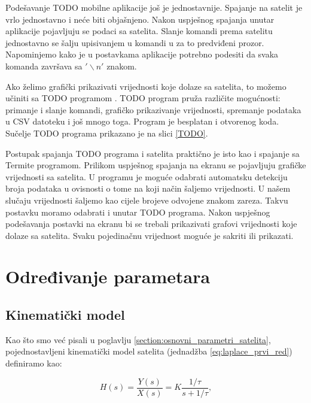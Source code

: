 \documentclass[times, utf8, diplomski, numeric]{templates/template}
\begin{document}
{{        Podešavanje TODO mobilne aplikacije još je jednostavnije. Spajanje na satelit je vrlo jednostavno i neće biti objašnjeno. Nakon uspješnog spajanja unutar aplikacije pojavljuju se podaci sa satelita. Slanje komandi prema satelitu jednostavno se šalju upisivanjem u komandi u za to predviđeni prozor. Napominjemo kako je u postavkama aplikacije potrebno podesiti da svaka komanda završava sa $'\backslash n'$ znakom. 

        
        Ako želimo grafički prikazivati vrijednosti koje dolaze sa satelita, to možemo učiniti sa TODO programom \cite{}. TODO program pruža različite mogućnosti: primanje i slanje komandi, grafičko prikazivanje vrijednosti, spremanje podataka u CSV datoteku i još mnogo toga. Program je besplatan i otvorenog koda. Sučelje TODO programa prikazano je na slici \ref{TODO}.


        Postupak spajanja TODO programa i satelita praktično je isto kao i spajanje sa Termite programom. Prilikom uspješnog spajanja na ekranu se pojavljuju grafičke vrijednosti sa satelita. U programu je moguće odabrati automatsku detekciju broja podataka u ovisnosti o tome na koji način šaljemo vrijednosti. U našem slučaju vrijednosti šaljemo kao cijele brojeve odvojene znakom zareza. Takvu postavku moramo odabrati i unutar TODO programa. Nakon uspješnog podešavanja postavki na ekranu bi se trebali prikazivati grafovi vrijednosti koje dolaze sa satelita. Svaku pojedinačnu vrijednost moguće je sakriti ili prikazati. 
    }

    \section{Određivanje parametara}{
        \subsection{Kinematički model}{
            Kao što smo već pisali u poglavlju \ref{section:osnovni_parametri_satelita}, pojednostavljeni kinematički model satelita (jednadžba \ref{eq:laplace_prvi_red}) definiramo kao:

            \begin{equation}
                H(s) = \frac{Y(s)}{X(s)} = K \frac{1/\tau}{s + 1/\tau},
            \end{equation}

}}}
\end{document}
